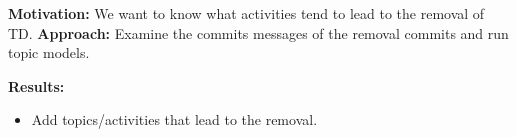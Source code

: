 
 \vspace{3mm}
 \noindent\rqiv
 \vspace{3mm}

 \noindent \textbf{Motivation:} 
We want to know what activities tend to lead to the removal of TD.
 \vspace{1mm}
 \noindent \textbf{Approach:} 
Examine the commits messages of the removal commits and run topic models.
 \vspace{1mm}
 
 \noindent \textbf{Results:} 
\begin{itemize}
\item Add topics/activities that lead to the removal.
\end{itemize}
 \conclusionbox{}